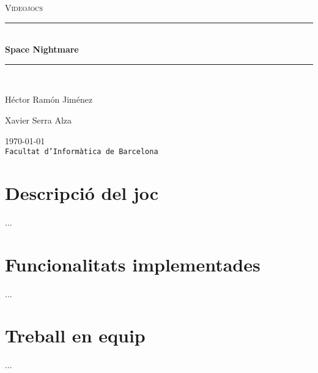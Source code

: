 \documentclass[a4paper, 11pt]{article}
\begin{document}
\begin{titlepage}
\begin{center}
\textsc{\Large Videojocs}
\\[1.5cm]
\rule{\linewidth}{0.5mm}
\\[0.4cm]
{\huge
\bfseries
Space Nightmare
\\[0.4cm]
}
\rule{\linewidth}{0.5mm}
\\[2.5cm]
\begin{minipage}{0.4\textwidth}
\begin{flushleft}
\large
Héctor Ramón Jiménez
\end{flushleft}
\end{minipage}
\begin{minipage}{0.4\textwidth}
\begin{flushright}
\large
Xavier Serra Alza
\end{flushright}
\end{minipage}
\vfill
{\large
\today
}
\\
{\large
\texttt{Facultat d'Informàtica de Barcelona}
}
\end{center}
\end{titlepage}
\tableofcontents
\clearpage
\section{Descripció del joc}
...
\section{Funcionalitats implementades}
...
\section{Treball en equip}
...


\end{document}
